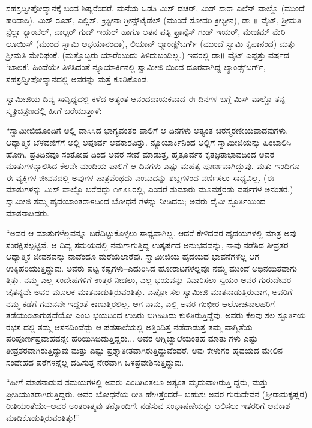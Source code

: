 ಸಹಸ್ರದ್ವೀಪೋದ್ಯಾನಕ್ಕೆ ಬಂದ ಶಿಷ್ಯರೆಂದರೆ, ಮನೆಯ ಒಡತಿ ಮಿಸ್ ಡಚರ್, ಮಿಸ್ ಸಾರಾ ಎಲೆನ್ ವಾಲ್ಡೊ (ಮುಂದೆ ಹರಿದಾಸಿ), ಮಿಸ್ ರೂತ್, ಎಲ್ಲಿಸ್, ಕ್ರಿಸ್ಟೀನಾ ಗ್ರೀನ್ಸ್​ಟೈಡೆಲ್ (ಮುಂದೆ ಸೋದರಿ ಕ್ರೀಸ್ಟೀನ), ಡಾ ॥ ವೈಟ್, ಶ್ರೀಮತಿ ಸ್ಟೆಲ್ಲಾ ಕ್ಯಾಂಬೆಲ್, ವಾಲ್ಟರ್ ಗುಡ್ ಇಯರ್ ಹಾಗೂ ಆತನ ಪತ್ನಿ ಫ್ರಾನ್ಸೆಸ್ ಗುಡ್ ಇಯರ್, ಮೇಡಮ್ ಮೆರಿ ಲೂಯಿಸ್ (ಮುಂದೆ ಸ್ವಾಮಿ ಅಭಯಾನಂದಾ), ಲಿಯಾನ್ ಲ್ಯಾಂಡ್ಸ್​ಬರ್ಗ್ (ಮುಂದೆ ಸ್ವಾಮಿ ಕೃಪಾನಂದ) ಮತ್ತು ಶ್ರೀಮತಿ ಮೇರಿಫಂಕೆ. (ಮತ್ತೊಬ್ಬರು ಯಾರೆಂಬುದು ತಿಳಿದುಬಂದಿಲ್ಲ.) ಇವರಲ್ಲಿ ಡಾ॥ ವೈಟ್ ಎಪ್ಪತ್ತು ವರ್ಷದ ‘ಬಾಲಕ’. ಹಿಂದೆಯೇ ತಿಳಿಸಿದಂತೆ ನ್ಯೂಯಾರ್ಕಿನಲ್ಲಿ ಸ್ವಾಮೀಜಿ ಯಿಂದ ದೂರವಾಗಿದ್ದ ಲ್ಯಾಂಡ್ಸ್​ಬರ್ಗ್, ಸಹಸ್ರದ್ವೀಪೋದ್ಯಾನದಲ್ಲಿ ಅವರನ್ನು ಮತ್ತೆ ಕೂಡಿಕೊಂಡ.

ಸ್ವಾಮೀಜಿಯ ದಿವ್ಯ ಸಾನ್ನಿಧ್ಯದಲ್ಲಿ ಕಳೆದ ಅತ್ಯಂತ ಆನಂದದಾಯಕವಾದ ಈ ದಿನಗಳ ಬಗ್ಗೆ ಮಿಸ್ ವಾಲ್ಡೊ ತನ್ನ ಸ್ಮೃತಿಚಿತ್ರಣದಲ್ಲಿ ಹೀಗೆ ಬರೆಯುತ್ತಾಳೆ: 

“ಸ್ವಾಮೀಜಿಯೊಂದಿಗೆ ಅಲ್ಲಿ ವಾಸಿಸಿದ ಭಾಗ್ಯವಂತರ ಪಾಲಿಗೆ ಆ ದಿನಗಳು ಅತ್ಯಂತ ಚಿರಸ್ಮರಣೀಯವಾದವುಗಳು. ಆಧ್ಯಾತ್ಮಿಕ ಬೆಳವಣಿಗೆಗೆ ಅಲ್ಲಿ ಅಪೂರ್ವ ಅವಕಾಶವಿತ್ತು. ನ್ಯೂಯಾರ್ಕಿನಿಂದ ಅಲ್ಲಿಗೆ ಸ್ವಾಮೀಜಿಯನ್ನು ಹಿಂಬಾಲಿಸಿ ಹೋಗಿ, ಪ್ರತಿದಿನವೂ ಸಂತೋಷ ದಿಂದ ಅವರ ಸೇವೆ ಮಾಡುತ್ತ, ಹೃತ್ಪೂರ್ವಕ ಕೃತಜ್ಞತಾಭಾವದಿಂದ ಅವರ ಮಾತುಗಳನ್ನಾಲಿಸಿದ ಕೆಲವೇ ಮಂದಿಯ ಪಾಲಿಗೆ ಆ ದಿನಗಳು ಎಷ್ಟು ಮಹತ್ವ ಪೂರ್ಣವಾಗಿದ್ದುವು. ಮತ್ತು ಇಂದಿಗೂ ಈ ವ್ಯಕ್ತಿಗಳ ಜೀವನದಲ್ಲಿ ಅವುಗಳ ಪಾತ್ರವೆಂಥದು ಎಂಬುದನ್ನು ಶಬ್ದಗಳಿಂದ ವರ್ಣಿಸಲು ಸಾಧ್ಯವಿಲ್ಲ. (ಈ ಮಾತುಗಳನ್ನು ಮಿಸ್ ವಾಲ್ಡೊ ಬರೆದದ್ದು ೧೯೨೭ರಲ್ಲಿ, ಎಂದರೆ ಸುಮಾರು ಮೂವತ್ತೆರಡು ವರ್ಷಗಳ ಅನಂತರ.) ಸ್ವಾಮೀಜಿ ತಮ್ಮ ಹೃದಯಾಂತರಾಳದಿಂದ ಬೋಧನೆ ಗಳನ್ನು ನೀಡಿದರು; ಅವರು ದೈವೀ ಸ್ಫೂರ್ತಿಯಿಂದ ಮಾತನಾಡಿದರು.

“ಅವರ ಆ ಮಾತುಗಳೆಲ್ಲವನ್ನೂ ಬರೆದಿಟ್ಟುಕೊಳ್ಳಲು ಸಾಧ್ಯವಾಗಿಲ್ಲ. ಆದರೆ ಕೇಳಿದವರ ಹೃದಯಗಳಲ್ಲಿ ಮಾತ್ರ ಅವು ಸಂರಕ್ಷಿಸಲ್ಪಟ್ಟಿವೆ. ಆ ದಿವ್ಯ ಸಮಯದಲ್ಲಿ ನಮಗಾಗುತ್ತಿದ್ದ ಉತ್ಕರ್ಷದ ಅನುಭವವನ್ನು, ನಾವು ನಡೆಸಿದ ತೀವ್ರತರ ಆಧ್ಯಾತ್ಮಿಕ ಜೀವನವನ್ನು ನಾವೆಂದೂ ಮರೆಯಲಾರೆವು. ಸ್ವಾಮೀಜಿಯ ಹೃದಯದ ಭಾವನೆಗಳೆಲ್ಲ ಆಗ ಉಕ್ಕಿಹರಿಯುತ್ತಿದ್ದುವು. ಅವರು ಪಟ್ಟ ಕಷ್ಟಗಳು–ಎದುರಿಸಿದ ಹೋರಾಟಗಳೆಲ್ಲವೂ ನಮ್ಮ ಮುಂದೆ ಅಭಿನಯಿತವಾಗು ತ್ತಿತ್ತು. ನಮ್ಮ ಎಲ್ಲ ಸಂದೇಹಗಳಿಗೆ ಉತ್ತರ ನೀಡಲು, ಎಲ್ಲ ಭಯವನ್ನು ನಿವಾರಿಸಲು ಸ್ವಯಂ ಅವರ ಗುರುದೇವರ ಚೈತನ್ಯವೇ ಅವರ ಮೂಲಕ ಮಾತನಾಡುತ್ತಿರುವಂತಿತ್ತು. ಎಷ್ಟೋ ಸಲ ಸ್ವಾಮೀಜಿ ಮಾತನಾಡುತ್ತಿರುವಾಗ, ಅವರಿಗೆ ನಮ್ಮ ಕಡೆಗೆ ಗಮನವೇ ಇದ್ದಂತೆ ಕಾಣುತ್ತಿರಲಿಲ್ಲ. ಆಗ ನಾನು, ಎಲ್ಲಿ ಅವರ ಗಂಭೀರ ಆಲೋಚನಾಲಹರಿಗೆ ತಡೆಯುಂಟಾಗುತ್ತದೆಯೋ ಎಂಬ ಭಯದಿಂದ ಉಸಿರು ಬಿಗಿಹಿಡಿದು ಕುಳಿತಿರುತ್ತಿದ್ದೆವು. ಅವರು ಕೆಲವು ಸಲ ಸ್ಫೂರ್ತಿಯ ರಭಸ ದಲ್ಲಿ ತಮ್ಮ ಆಸನದಿಂದೆದ್ದು ಆ ಪಡಸಾಲೆಯಲ್ಲಿ ಅತ್ತಿಂದಿತ್ತ ನಡೆದಾಡುತ್ತ ತಮ್ಮ ವಾಗ್ಮಿತೆಯ ಪರಿಪೂರ್ಣಪ್ರವಾಹವನ್ನೇ ಹರಿಯಿಸಿಬಿಡುತ್ತಿದ್ದರು... ಅವರ ಅಗ್ನಿಜ್ವಾಲೆಯಂತಹ ಮಾತು ಗಳು ಎಷ್ಟು ತೀವ್ರತರವಾಗಿರುತ್ತಿದ್ದುವು ಮತ್ತು ಎಷ್ಟು ಪ್ರಶ್ನಾತೀತವಾಗಿರುತ್ತಿದ್ದುವೆಂದರೆ, ಅವು ಕೇಳುಗರ ಹೃದಯದ ಮೇಲಿನ ಸಂದೇಹದ ಪರೆಗಳನ್ನೆಲ್ಲ ದಹಿಸುತ್ತ ನೇರವಾಗಿ ಒಳಪ್ರವೇಶಿಸುತ್ತಿದ್ದುವು.

“ಹೀಗೆ ಮಾತನಾಡುವ ಸಮಯಗಳಲ್ಲಿ ಅವರು ಎಂದಿಗಿಂತಲೂ ಅತ್ಯಂತ ಮೃದುವಾಗಿರುತ್ತಿ ದ್ದರು, ಮತ್ತು ಪ್ರೀತಿಯುತರಾಗಿರುತ್ತಿದ್ದರು. ಅವರ ಬೋಧನೆಯ ರೀತಿ ಹೇಗಿತ್ತೆಂದರೆ– ಬಹುಶಃ ಅವರ ಗುರುದೇವನ (ಶ್ರೀರಾಮಕೃಷ್ಣರ) ರೀತಿಯಂತೆಯೇ–ಅವರ ಅಂತರಾತ್ಮವು ತನ್ನೊಂದಿಗೇ ನಡೆಸುವ ಸಂಭಾಷಣೆಯನ್ನು ಆಲಿಸಲು ಇತರರಿಗೆ ಅವಕಾಶ ಮಾಡಿಕೊಡುತ್ತಿರುವಂತಿತ್ತು!”


